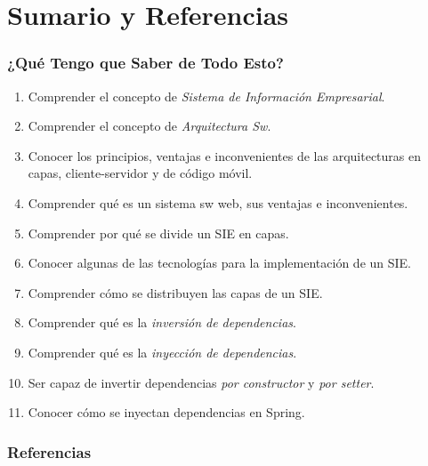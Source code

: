 \documentclass[handout,a4paper,t,xcolor=pst,dvips,colortheme]{beamer}
\begin{document}
\section{Sumario y Referencias}

\begin{frame}[c]
    \frametitle{¿Qué Tengo que Saber de Todo Esto?}
    \begin{enumerate}[<+->]
        \item Comprender el concepto de \emph{Sistema de Información Empresarial}.
        \item Comprender el concepto de \emph{Arquitectura Sw}.
        \item Conocer los principios, ventajas e inconvenientes de las arquitecturas en capas, cliente-servidor y de código móvil.
        \item Comprender qué es un sistema sw web, sus ventajas e inconvenientes.
        \item Comprender por qué se divide un SIE en capas.
        \item Conocer algunas de las tecnologías para la implementación de un SIE.
        \item Comprender cómo se distribuyen las capas de un SIE.
        \item Comprender qué es la \emph{inversión de dependencias}.
        \item Comprender qué es la \emph{inyección de dependencias}.
        \item Ser capaz de invertir dependencias \emph{por constructor} y \emph{por setter}.
        \item Conocer cómo se inyectan dependencias en Spring.
    \end{enumerate}
\end{frame}

\begin{frame}
	\frametitle{Referencias}
    \nocite{}
	
    
\end{frame}
\end{document}
